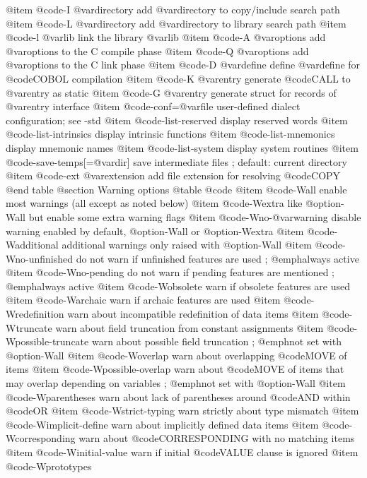 @item @code{-I @var{directory}}
add @var{directory} to copy/include search path
@item @code{-L @var{directory}}
add @var{directory} to library search path
@item @code{-l @var{lib}}
link the library @var{lib}
@item @code{-A @var{options}}
add @var{options} to the C compile phase
@item @code{-Q @var{options}}
add @var{options} to the C link phase
@item @code{-D @var{define}}
define @var{define} for @code{COBOL} compilation
@item @code{-K @var{entry}}
generate @code{CALL} to @var{entry} as static
@item @code{-G @var{entry}}
generate struct for records of @var{entry} interface
@item @code{-conf=@var{file}}
user-defined dialect configuration; see -std
@item @code{-list-reserved}
display reserved words
@item @code{-list-intrinsics}
display intrinsic functions
@item @code{-list-mnemonics}
display mnemonic names
@item @code{-list-system}
display system routines
@item @code{-save-temps[=@var{dir}]}
save intermediate files
; default: current directory
@item @code{-ext @var{extension}}
add file extension for resolving @code{COPY}
@end table
@section Warning options
@table @code
@item @code{-Wall}
enable most warnings (all except as noted below)
@item @code{-Wextra}
like @option{-Wall} but enable some extra warning flags
@item @code{-Wno-@var{warning}}
disable warning enabled by default, @option{-Wall} or @option{-Wextra}
@item @code{-Wadditional}
additional warnings only raised with @option{-Wall}
@item @code{-Wno-unfinished}
do not warn if unfinished features are used
; @emph{always active}
@item @code{-Wno-pending}
do not warn if pending features are mentioned
; @emph{always active}
@item @code{-Wobsolete}
warn if obsolete features are used
@item @code{-Warchaic}
warn if archaic features are used
@item @code{-Wredefinition}
warn about incompatible redefinition of data items
@item @code{-Wtruncate}
warn about field truncation from constant assignments
@item @code{-Wpossible-truncate}
warn about possible field truncation
; @emph{not set with @option{-Wall}}
@item @code{-Woverlap}
warn about overlapping @code{MOVE} of items
@item @code{-Wpossible-overlap}
warn about @code{MOVE} of items that may overlap depending on variables
; @emph{not set with @option{-Wall}}
@item @code{-Wparentheses}
warn about lack of parentheses around @code{AND} within @code{OR}
@item @code{-Wstrict-typing}
warn strictly about type mismatch
@item @code{-Wimplicit-define}
warn about implicitly defined data items
@item @code{-Wcorresponding}
warn about @code{CORRESPONDING} with no matching items
@item @code{-Winitial-value}
warn if initial @code{VALUE} clause is ignored
@item @code{-Wprototypes}
